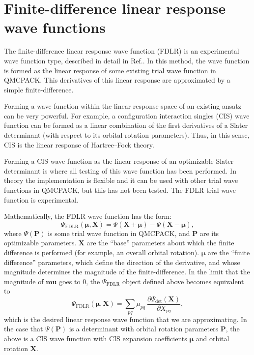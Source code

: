 \section{Finite-difference linear response wave functions}

\label{sec:fdlr}

The finite-difference linear response wave function (FDLR) is an
experimental wave function type, described in detail in
Ref.\cite{blunt_charge-transfer_2017}. In this method, the wave
function is formed as the linear response of some existing trial wave
function in QMCPACK. This derivatives of this linear response are
approximated by a simple finite-difference.

Forming a wave function within the linear response space of an existing ansatz can be very powerful. For example, a configuration interaction singles (CIS) wave function can be formed as a linear combination of the first derivatives of a Slater determinant (with respect to its orbital rotation parameters). Thus, in this sense, CIS is the linear response of Hartree--Fock theory.

Forming a CIS wave function as the linear response of an optimizable Slater determinant is where all testing of this wave function has been performed. In theory the implementation is flexible and it can be used with other trial wave functions in QMCPACK, but this has not been tested. The FDLR trial wave function is experimental.

Mathematically, the FDLR wave function has the form:
\begin{equation}
\Psi_{\textrm{FDLR}} (\mathbf{\mu}, \mathbf{X}) = \Psi (\mathbf{X} + \mathbf{\mu}) - \Psi (\mathbf{X} - \mathbf{\mu}),
\end{equation}
where $\Psi(\mathbf{P})$ is some trial wave function in QMCPACK, and $\mathbf{P}$ are its optimizable parameters. $\mathbf{X}$ are the ``base'' parameters about which the finite difference is performed (for example, an overall orbital rotation). $\mathbf{\mu}$ are the ``finite difference'' parameters, which define the direction of the derivative, and whose magnitude determines the magnitude of the finite-difference. In the limit that the magnitude of $\mathbf{mu}$ goes to $0$, the $\Psi_{\textrm{FDLR}}$ object defined above becomes equivalent to
\begin{equation}
\Psi_{\textrm{FDLR}} (\mathbf{\mu}, \mathbf{X}) = \sum_{pq} \mu_{pq} \: \frac{\partial \Psi_{\textrm{det}} (\mathbf{X}) }{\partial X_{pq}},
\end{equation}
which is the desired linear response wave function that we are approximating. In the case that $\Psi(\mathbf{P})$ is a determinant with orbital rotation parameters $\mathbf{P}$, the above is a CIS wave function with CIS expansion coefficients $\mathbf{\mu}$ and orbital rotation $\mathbf{X}$.

